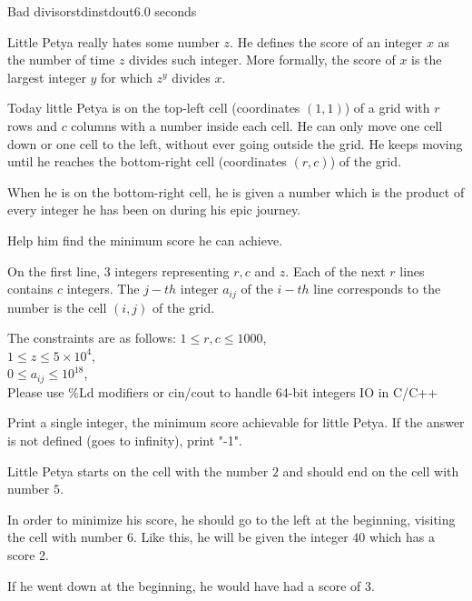 \begin{problem}{Bad divisor}{stdin}{stdout}{6.0 seconds}


Little Petya really hates some number $z$. He defines the score of an integer $x$ as the number of time $z$ divides such integer.
More formally, the score of $x$ is the largest integer $y$ for which $z^y$ divides $x$.

Today little Petya is on the top-left cell (coordinates $(1,1)$) of a grid with $r$ rows and $c$ columns with a number inside each cell.
He can only move one cell down or one cell to the left, without ever going outside the grid. 
He keeps moving until he reaches the bottom-right cell (coordinates $(r,c)$) of the grid. 
\par When he is on the bottom-right cell, he is given a number which is the product of every integer he has been on during his epic journey. 
\par Help him find the minimum score he can achieve.


\InputFile

On the first line, 3 integers representing $r,c$ and $z$.
Each of the next $r$ lines contains $c$ integers.
The $j-th$ integer $a_{ij}$ of the $i-th$ line corresponds to the number is the cell $(i,j)$ of the grid.


The constraints are as follows:
$1\le r,c \le 1000$,\\ 
$1\le z \le 5\times 10^4$,\\ 
$0\le a_{ij} \le 10^{18}$,\\ 

Please use \%Ld modifiers or cin/cout to handle 64-bit integers IO in C/C++

\OutputFile

Print a single integer, the minimum score achievable for little Petya.
If the answer is not defined (goes to infinity), print "-1".

\Example

\begin{examplewide}
%
\end{examplewide}

Little Petya starts on the cell with the number $2$ and should end on the cell with number $5$.
\par In order to minimize his score, he should go to the left at the beginning, visiting the cell with number $6$. Like this, he will be given the integer $40$ which has a score 2.
\par If he went down at the beginning, he would have had a score of 3.

\end{problem}
